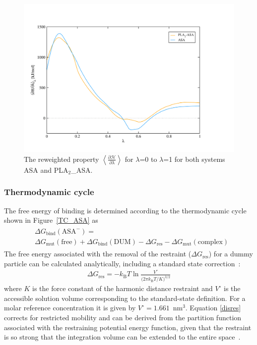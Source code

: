 \begin{figure}[H]
    \centering
    \includegraphics[scale=0.3]{../05_tutorial_02/figures/ana_TI.png}
    \caption{The reweighted property $\left<\frac{\partial\mathcal{H}}{\partial\lambda}\right>$ for $\lambda$=0 to $\lambda$=1 for both systems ASA and PLA$_2$\_ASA.}
    \label{TI_ASA}
\end{figure}

\subsubsection{Thermodynamic cycle}
The free energy of binding is determined according to the thermodynamic cycle shown in Figure~\ref{TC_ASA} as
\begin{align}\begin{split}
& \Delta G_{\text{bind}}(\text{ASA}^-)= \\ 
& \Delta G_{\text{mut}}(\text{free})+\Delta G_{\text{bind}}(\text{DUM})-\Delta G_{\text{res}}-\Delta G_{\text{mut}}(\text{complex})
\end{split}\end{align}
%
The free energy associated with the removal of the restraint ($\Delta G_{\text{res}}$) for a dummy particle can be calculated analytically, including a standard state correction~\cite{Roux, Boresch}: 
\begin{align} \label{disres}
    \Delta G_{\text{res}} = -k_{\text{B}}T \ln\frac{V^{\circ}}{\Big(2\pi k_{\text{B}}T/K\Big)^{3/2}}
\end{align}
where $K$ is the force constant of the harmonic distance restraint and $V^{\circ}$ is the accessible solution volume corresponding to the standard-state definition. For a molar reference concentration it is given by $V^{\circ}=1.661$~nm$^3$.
Equation \ref{disres} corrects for restricted mobility and can be derived from the partition function associated with the restraining potential energy function, 
given that the restraint is so strong that the integration volume can be extended to the entire space~\cite{Gebhardt2016}.

